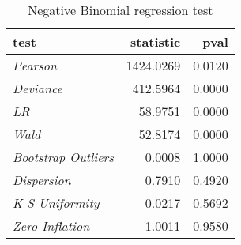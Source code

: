 \begin{table}[H]

\caption{\label{tab:negbin_reg_tests}Negative Binomial regression test}
\centering
\begin{tabular}[t]{>{}l|r|r}
\hline
test & statistic & pval\\
\hline
\hline
\em{Pearson} & 1424.0269 & 0.0120\\
\hline
\em{Deviance} & 412.5964 & 0.0000\\
\hline
\em{LR} & 58.9751 & 0.0000\\
\hline
\em{Wald} & 52.8174 & 0.0000\\
\hline
\em{Bootstrap Outliers} & 0.0008 & 1.0000\\
\hline
\em{Dispersion} & 0.7910 & 0.4920\\
\hline
\em{K-S Uniformity} & 0.0217 & 0.5692\\
\hline
\em{Zero Inflation} & 1.0011 & 0.9580\\
\hline
\end{tabular}
\end{table}